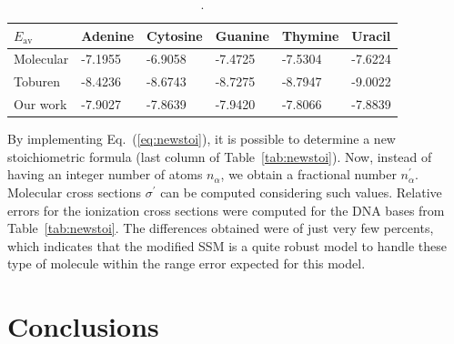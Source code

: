 \documentclass[preprint,12pt]{article}
\begin{document}
\begin{table}[H]
\begin{center}
\begin{tabular}{llllll}
\hline
 $E_{\text{av}}$ & Adenine & Cytosine & Guanine & Thymine & Uracil \\
\hline
 Molecular & -7.1955 & -6.9058 & -7.4725 & -7.5304 & -7.6224 \\
 Toburen   & -8.4236 & -8.6743 & -8.7275 & -8.7947 & -9.0022 \\
 Our work  & -7.9027 & -7.8639 & -7.9420 & -7.8066 & -7.8839 \\
\hline
\end{tabular}
\caption{.}
\label{tab:gravener}
\end{center}
\end{table}


By implementing Eq.~(\ref{eq:newstoi}), it is possible to determine a 
new stoichiometric formula (last column of Table~\ref{tab:newstoi}). 
Now, instead of having an integer number of atoms $n_{\alpha}$, we obtain 
a fractional number $n_{\alpha}^{\prime}$. 
Molecular cross sections $\sigma^{\prime}$ can be computed considering 
such values. Relative errors for the ionization cross sections were 
computed for the DNA bases from Table~\ref{tab:newstoi}. The differences 
obtained were of just very few percents, which indicates that the modified 
SSM is a quite robust model to handle these type of molecule within 
the range error expected for this model.

\section{Conclusions}
\end{document}
